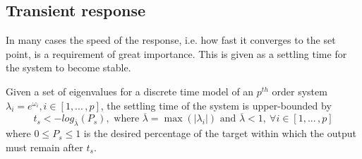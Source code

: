 \documentclass[sigconf]{llncs}
\newcommand{\mat}[1]{{#1}}
\renewcommand{\vec}[1]{{#1}}
\begin{document}

\subsection{Transient response} 
\label{sec:transientspecification}
In many cases the speed of the response, i.e. how fast it converges to the set point, is a requirement of great importance. 
This is given as a settling time for the system to become stable.
 
\begin{theorem}
Given a set of eigenvalues for a discrete time model of an $p^{th}$ order system $\lambda_i =e^{\omega_i}, i \in [1, ...\,,p]$, the settling time of the system is upper-bounded by
\begin{equation}
t_s<-log_{\overline{\lambda}}({P_s}), \text{ where }  \overline{\lambda} = \max(|\lambda_i|) \text{ and } \overline{\lambda}<1,\ \forall i \in [1, ...\,,p]
\label{eq:set_time}
\end{equation}
where $0\leq P_s \leq 1$ is the desired percentage of the target within which the output must remain after $t_s$.
\end{theorem}
\end{document}
